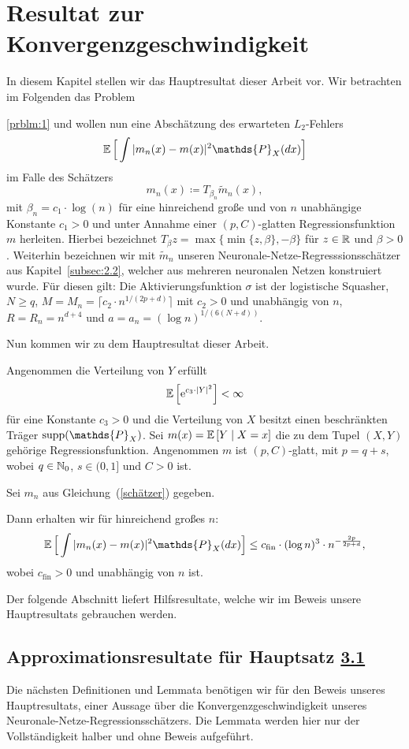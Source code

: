 \chapter{Resultat zur Konvergenzgeschwindigkeit}
\label{chap:3}

In diesem Kapitel stellen wir das Hauptresultat dieser Arbeit vor.
Wir betrachten im Folgenden das Problem~{\ref{prblm:1} und wollen nun eine Abschätzung des erwarteten $L_2$-Fehlers 
$$\E \Big[\int |m_n(x) - m(x)|^2  \mathds{P}_X(dx)\Big]$$
im Falle des Schätzers 
\begin{equation}
\label{schätzer}
m_n(x) \coloneqq T_{\beta_n}\tilde{m}_n (x),
\end{equation}
mit $\beta_n = c_1 \cdot \log(n)$ für eine hinreichend große und von $n$ unabhängige Konstante $c_1 > 0$ und unter Annahme einer $(p,C)$-glatten Regressionsfunktion $m$ herleiten. Hierbei bezeichnet $T_{\beta}z = \max\{\min\{z, \beta\}, -\beta\}$
für $z \in \mathbb{R}$ und $\beta > 0$. Weiterhin bezeichnen wir mit $\tilde{m}_n$ unseren Neuronale-Netze-Regresssionsschätzer aus Kapitel~\ref{subsec:2.2}, welcher aus mehreren neuronalen Netzen konstruiert wurde. Für diesen gilt: 
Die Aktivierungsfunktion $\sigma$ ist der logistische Squasher, $N \geq q$, $M = M_n = \lceil c_2 \cdot n^{1/(2p + d)}\rceil$ mit $c_2 >0$ und unabhängig von $n$, $R = R_n = n^{d + 4}$ und $a = a_n = (\log n)^{1/(6(N + d))}.$

Nun kommen wir zu dem Hauptresultat dieser Arbeit.
\begin{mthm}
\label{optstop}
Angenommen die Verteilung von $Y$ erfüllt 
$$ \mathbb{E}\,\Big[\mathrm{e}^{c_3 \cdot |Y|^2}\Big] < \infty$$
für eine Konstante $c_3 > 0$ und die Verteilung von $X$ besitzt einen beschränkten Träger $\supp(\mathds{P}_X)$. Sei $m(x) = \mathbb{E}\,[Y \mid X = x]$ die zu dem Tupel $(X, Y)$ gehörige Regressionsfunktion.
Angenommen $m$ ist $(p,C)$-glatt, mit $p = q + s$, wobei $q \in \mathbb{N}_0$, $s \in (0,1]$ und $C > 0$ ist.

Sei $m_n$ aus Gleichung~(\ref{schätzer}) gegeben.

Dann erhalten wir für hinreichend großes $n$:
$$\E \Big[\int |m_n(x) - m(x)|^2  \mathds{P}_X(dx)\Big] \leq c_{\mathrm{fin}} \cdot (\log n)^3 \cdot n^{- \frac{2p}{2p + d}},$$
wobei $c_{\mathrm{fin}} > 0$ und unabhängig von $n$ ist.
\end{mthm}

Der folgende Abschnitt liefert Hilfsresultate, welche wir im Beweis unsere Hauptresultats gebrauchen werden.

\section{Approximationsresultate für Hauptsatz \hyperref[optstop]{3.1}}
Die nächsten  Definitionen und Lemmata benötigen wir für den Beweis unseres Hauptresultats, einer Aussage über die Konvergenzgeschwindigkeit unseres Neuronale-Netze-Regressionsschätzers. Die Lemmata werden hier nur der Vollständigkeit halber und ohne Beweis aufgeführt. 

}

